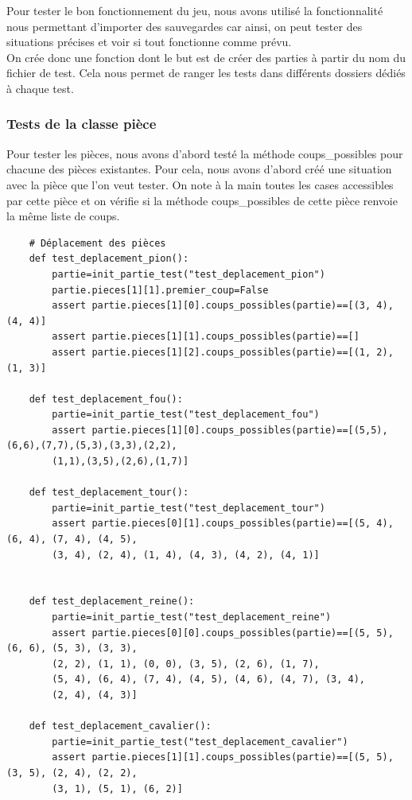 \documentclass{article}
\begin{document}
Pour tester le bon fonctionnement du jeu, nous avons utilisé la fonctionnalité nous permettant d'importer des sauvegardes car ainsi, on peut tester des situations précises et voir si tout fonctionne comme prévu.
\\
On crée donc une fonction dont le but est de créer des parties à partir du nom du fichier de test. Cela nous permet de ranger les tests dans différents dossiers dédiés à chaque test.

\subsubsection{Tests de la classe pièce}
Pour tester les pièces, nous avons d'abord testé la méthode coups\_possibles pour chacune des pièces existantes. Pour cela, nous avons d'abord créé une situation avec la pièce que l'on veut tester. On note à la main toutes les cases accessibles par cette pièce et on vérifie si la méthode coups\_possibles de cette pièce renvoie la même liste de coups.

\begin{verbatim}
    # Déplacement des pièces
    def test_deplacement_pion():
        partie=init_partie_test("test_deplacement_pion")
        partie.pieces[1][1].premier_coup=False
        assert partie.pieces[1][0].coups_possibles(partie)==[(3, 4), (4, 4)]
        assert partie.pieces[1][1].coups_possibles(partie)==[]
        assert partie.pieces[1][2].coups_possibles(partie)==[(1, 2), (1, 3)]
    
    def test_deplacement_fou():
        partie=init_partie_test("test_deplacement_fou")
        assert partie.pieces[1][0].coups_possibles(partie)==[(5,5),(6,6),(7,7),(5,3),(3,3),(2,2),
        (1,1),(3,5),(2,6),(1,7)]
                
    def test_deplacement_tour():
        partie=init_partie_test("test_deplacement_tour")
        assert partie.pieces[0][1].coups_possibles(partie)==[(5, 4), (6, 4), (7, 4), (4, 5), 
        (3, 4), (2, 4), (1, 4), (4, 3), (4, 2), (4, 1)]
    
    
    def test_deplacement_reine():
        partie=init_partie_test("test_deplacement_reine")
        assert partie.pieces[0][0].coups_possibles(partie)==[(5, 5), (6, 6), (5, 3), (3, 3), 
        (2, 2), (1, 1), (0, 0), (3, 5), (2, 6), (1, 7), 
        (5, 4), (6, 4), (7, 4), (4, 5), (4, 6), (4, 7), (3, 4), 
        (2, 4), (4, 3)]
    
    def test_deplacement_cavalier():   
        partie=init_partie_test("test_deplacement_cavalier")
        assert partie.pieces[1][1].coups_possibles(partie)==[(5, 5), (3, 5), (2, 4), (2, 2), 
        (3, 1), (5, 1), (6, 2)]
\end{verbatim}
\end{document}
